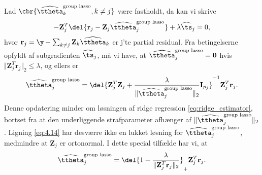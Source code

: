 Lad $\cbr{\widehat{\ttheta}^\text{group lasso}_k, k \neq j}$ være fastholdt, da kan vi skrive
\begin{align*}
- \mathbf{Z}_{j}^T \del{\mathbf{r}_j - \mathbf{Z}_j \widehat{\ttheta}^\text{group lasso}_j} + \lambda \widehat{\ts}_j = 0,
\end{align*}
hvor $\mathbf{r}_j = \y - \sum_{k \neq j} \mathbf{Z}_k \widehat{\ttheta}_k $ er j'te partial residual.
Fra betingelserne opfyldt af subgradienten $\widehat{\ts}_j$, må vi have, at $\widehat{\ttheta}^\text{group lasso}_j =\mathbf{0}$ hvis $\Vert \mathbf{Z}_j^T \mathbf{r}_j \Vert_2 \leq \lambda$, og ellers er
\begin{align}
\widehat{\ttheta}_j^\text{group lasso} = \del{\mathbf{Z}_j^T \mathbf{Z}_j + \frac{\lambda}{\Vert \widehat{\ttheta}^\text{group lasso}_j \Vert_2} \mathbf{I}_{p_j}}^{-1} \mathbf{Z}_j^T \mathbf{r}_j. \label{eq:4.14}
\end{align}
Denne opdatering minder om løsningen af ridge regression \eqref{eq:ridge_estimator}, bortset fra at den underliggende strafparameter afhænger af $\Vert \widehat{\ttheta}^\text{group lasso}_j \Vert_2$.
Ligning \eqref{eq:4.14} har desværre ikke en lukket løsning for $\widehat{\ttheta}^\text{group lasso}_j$, medmindre at $\mathbf{Z}_j$ er ortonormal. 
I dette special tilfælde har vi, at
\begin{align*}
\widehat{\ttheta}^\text{group lasso}_j = \del{1 - \frac{\lambda}{\Vert \mathbf{Z}_j^T \mathbf{r}_j \Vert_2}}_+  \mathbf{Z}_j^T \mathbf{r}_j.
\end{align*}

